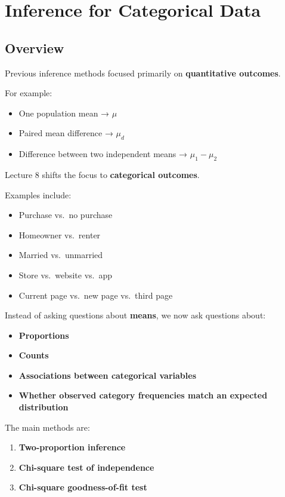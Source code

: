 \documentclass[
  letterpaper,
  DIV=11,
  numbers=noendperiod]{scrreprt}
\providecommand{\tightlist}{%
  \setlength{\itemsep}{0pt}\setlength{\parskip}{0pt}}
\begin{document}
\chapter{Inference for Categorical
Data}\label{inference-for-categorical-data}

\section{Overview}\label{overview-7}

Previous inference methods focused primarily on \textbf{quantitative
outcomes}.

For example:

\begin{itemize}
\tightlist
\item
  One population mean → \(\mu\)
\item
  Paired mean difference → \(\mu_d\)
\item
  Difference between two independent means → \(\mu_1-\mu_2\)
\end{itemize}

Lecture 8 shifts the focus to \textbf{categorical outcomes}.

Examples include:

\begin{itemize}
\tightlist
\item
  Purchase vs.~no purchase
\item
  Homeowner vs.~renter
\item
  Married vs.~unmarried
\item
  Store vs.~website vs.~app
\item
  Current page vs.~new page vs.~third page
\end{itemize}

Instead of asking questions about \textbf{means}, we now ask questions
about:

\begin{itemize}
\tightlist
\item
  \textbf{Proportions}
\item
  \textbf{Counts}
\item
  \textbf{Associations between categorical variables}
\item
  \textbf{Whether observed category frequencies match an expected
  distribution}
\end{itemize}

The main methods are:

\begin{enumerate}
\def\labelenumi{\arabic{enumi}.}
\tightlist
\item
  \textbf{Two-proportion inference}
\item
  \textbf{Chi-square test of independence}
\item
  \textbf{Chi-square goodness-of-fit test}
\end{enumerate}
\end{document}
